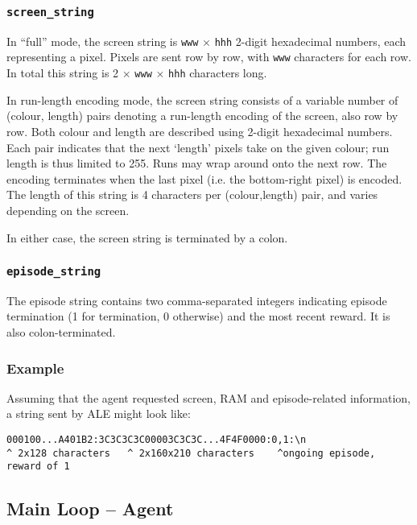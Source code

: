 \documentclass[12pt]{article}
\begin{document}
\subsubsection{\texttt{screen\_string}}

In ``full'' mode, the screen string is \texttt{www} $\times$ \texttt{hhh} 2-digit hexadecimal numbers, each representing a pixel. Pixels are sent row by row, with \texttt{www} characters for each row. In total this string is 2 $\times$ \texttt{www} $\times$ \texttt{hhh} characters long.

In run-length encoding mode, the screen string consists of a variable number of (colour, length) pairs denoting a run-length encoding of the screen, also row by row. Both colour and length are described using 2-digit hexadecimal numbers. Each pair indicates that the next `length' pixels take on the given colour; run length is thus limited to 255. Runs may wrap around onto the next row. The encoding terminates when the last pixel (i.e. the bottom-right pixel) is encoded. The length of this string is 4 characters per (colour,length) pair, and varies depending on the screen.

In either case, the screen string is terminated by a colon.

\subsubsection{\texttt{episode\_string}}

The episode string contains two comma-separated integers indicating episode termination (1 for
termination, 0 otherwise) and the most recent reward. It is also colon-terminated.

\subsubsection{Example}

Assuming that the agent requested screen, RAM and episode-related information, a string sent by ALE might look like:

\begin{verbatim}
000100...A401B2:3C3C3C3C00003C3C3C...4F4F0000:0,1:\n
^ 2x128 characters   ^ 2x160x210 characters    ^ongoing episode, reward of 1
\end{verbatim}

\subsection{Main Loop -- Agent}
\end{document}
